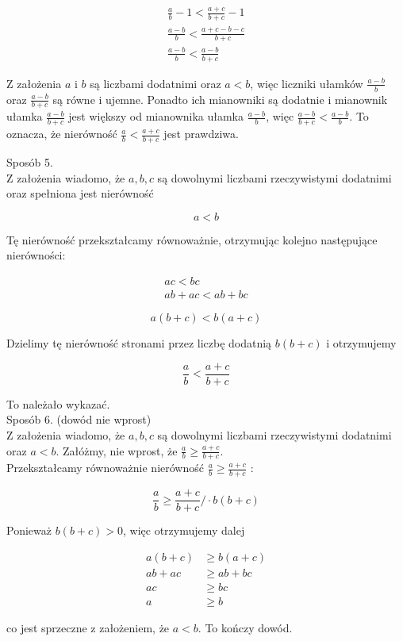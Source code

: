 \documentclass[10pt]{article}
\begin{document}
$$
\begin{gathered}
\frac{a}{b}-1<\frac{a+c}{b+c}-1 \\
\frac{a-b}{b}<\frac{a+c-b-c}{b+c} \\
\frac{a-b}{b}<\frac{a-b}{b+c}
\end{gathered}
$$

Z założenia $a$ i $b$ są liczbami dodatnimi oraz $a<b$, więc liczniki ułamków $\frac{a-b}{b}$ oraz $\frac{a-b}{b+c}$ są równe i ujemne. Ponadto ich mianowniki są dodatnie i mianownik ułamka $\frac{a-b}{b+c}$ jest większy od mianownika ułamka $\frac{a-b}{b}$, więc $\frac{a-b}{b+c}<\frac{a-b}{b}$. To oznacza, że nierówność $\frac{a}{b}<\frac{a+c}{b+c}$ jest prawdziwa.

Sposób 5.\\
Z założenia wiadomo, że $a, b, c$ są dowolnymi liczbami rzeczywistymi dodatnimi oraz spełniona jest nierówność

$$
a<b
$$

Tę nierówność przekształcamy równoważnie, otrzymując kolejno następujące nierówności:

$$
\begin{gathered}
a c<b c \\
a b+a c<a b+b c
\end{gathered}
$$

$$
a(b+c)<b(a+c)
$$

Dzielimy tę nierówność stronami przez liczbę dodatnią $b(b+c)$ i otrzymujemy

$$
\frac{a}{b}<\frac{a+c}{b+c}
$$

To należało wykazać.\\
Sposób 6. (dowód nie wprost)\\
Z założenia wiadomo, że $a, b, c$ są dowolnymi liczbami rzeczywistymi dodatnimi oraz $a<b$. Załóżmy, nie wprost, że $\frac{a}{b} \geq \frac{a+c}{b+c}$.\\
Przekształcamy równoważnie nierówność $\frac{a}{b} \geq \frac{a+c}{b+c}$ :

$$
\frac{a}{b} \geq \frac{a+c}{b+c} / \cdot b(b+c)
$$

Ponieważ $b(b+c)>0$, więc otrzymujemy dalej

$$
\begin{aligned}
a(b+c) & \geq b(a+c) \\
a b+a c & \geq a b+b c \\
a c & \geq b c \\
a & \geq b
\end{aligned}
$$

co jest sprzeczne z założeniem, że $a<b$. To kończy dowód.
\end{document}
